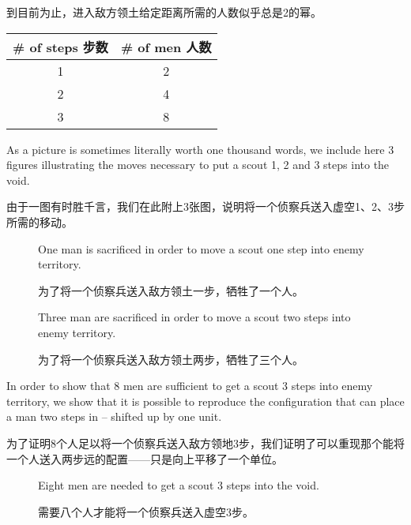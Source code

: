 到目前为止，进入敌方领土给定距离所需的人数似乎总是2的幂。

\begin{center}
\begin{tabular}{c|c}
\# of steps 步数 & \# of men 人数 \\ \hline
1 & 2 \\
2 & 4 \\
3 & 8 \\
\end{tabular}
\end{center}  

As a picture is sometimes literally worth one thousand words, we
include here 3 figures illustrating the moves necessary to put 
a scout 1, 2 and 3 steps into the void.

由于一图有时胜千言，我们在此附上3张图，说明将一个侦察兵送入虚空1、2、3步所需的移动。

\begin{figure}[!hbtp] 
\begin{center}

\end{center}
\caption[Moving one step into the void is trivial.]{One man is sacrificed in 
order to move a scout one step into enemy territory.}
\caption[迈入虚空一步是微不足道的。]{为了将一个侦察兵送入敌方领土一步，牺牲了一个人。}
\label{fig:one_step}
\end{figure}

\begin{figure}[!hbtp] 
\begin{center}

\end{center}
\caption[Moving two steps into the void is more difficult.]{Three man are sacrificed in 
order to move a scout two steps into enemy territory.}
\caption[迈入虚空两步更加困难。]{为了将一个侦察兵送入敌方领土两步，牺牲了三个人。}
\label{fig:two_steps}
\end{figure}

In order to show that 8 men are sufficient to get a scout 3 steps into
enemy territory, we show that it is possible to reproduce the configuration
that can place a man two steps in -- shifted up by one unit.

为了证明8个人足以将一个侦察兵送入敌方领地3步，我们证明了可以重现那个能将一个人送入两步远的配置——只是向上平移了一个单位。

\begin{figure}[!hbtp] 
\hspace{-.2in}
\caption[Moving three steps into the void takes 8 men.]{Eight men are needed to
get a scout 3 steps into the void.}
\caption[迈入虚空三步需要8个人。]{需要八个人才能将一个侦察兵送入虚空3步。}
\label{fig:three_steps}
\end{figure}

